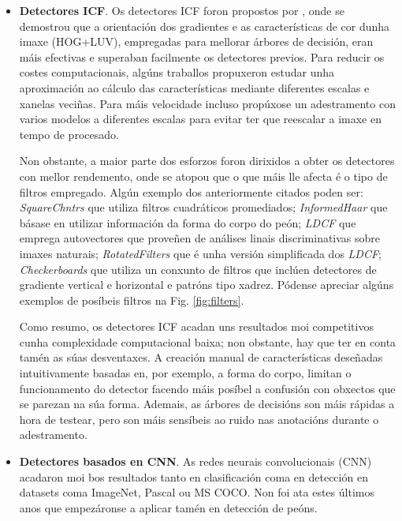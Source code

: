 \documentclass[galician]{./head/uvigo-tfg}
\begin{document}
    \begin{itemize}
        \item \textbf{Detectores ICF}. Os detectores ICF foron propostos por \cite{dollar2014fast}\cite{dollar2009integral}, onde se demostrou que a orientación dos gradientes e as características de cor dunha imaxe (HOG+LUV), empregadas para mellorar árbores de decisión, eran máis efectivas e superaban facilmente os detectores previos. Para reducir os costes computacionais, algúns traballos propuxeron estudar unha aproximación ao cálculo das características mediante diferentes escalas e xanelas veciñas\cite{dollar2012crosstalk}. Para máis velocidade incluso propúxose un adestramento con varios modelos a diferentes escalas para evitar ter que reescalar a imaxe en tempo de procesado\cite{benenson2012pedestrian}.
        \par Non obstante, a maior parte dos esforzos foron dirixidos a obter os detectores con mellor rendemento\cite{benenson2013seeking}\cite{daniel2016semantic}\cite{nam2014local}\cite{paisitkriangkrai2014strengthening}\cite{zhang}\cite{zhang2015exploring}\cite{filtered}, onde se atopou que o que máis lle afecta é o tipo de filtros empregado. Algún exemplo dos anteriormente citados poden ser: \textit{SquareChntrs}\cite{benenson2014ten} que utiliza filtros cuadráticos promediados; \textit{InformedHaar}\cite{zhang} que básase en utilizar información da forma do corpo do peón; \textit{LDCF}\cite{nam2014local} que emprega autovectores que proveñen de análises linais discriminativas sobre imaxes naturais; \textit{RotatedFilters} que é unha versión simplificada dos \textit{LDCF}\cite{zhang2016far}; \textit{Checkerboards}\cite{filtered} que utiliza un conxunto de filtros  que inclúen detectores de gradiente vertical e horizontal e patróns tipo xadrez. Pódense apreciar algúns exemplos de posíbeis filtros na Fig. \ref{fig:filters}.
        \par Como resumo, os detectores ICF acadan uns resultados moi competitivos cunha complexidade computacional baixa; non obstante, hay que ter en conta tamén as súas desventaxes. A creación manual de características deseñadas intuitivamente basadas en, por exemplo, a forma do corpo, limitan o funcionamento do detector facendo máis posíbel a confusión con obxectos que se parezan na súa forma. Ademais, as árbores de decisións son máis rápidas a hora de testear, pero son máis sensíbeis ao ruido nas anotacións durante o adestramento.
        \item\textbf{Detectores basados en CNN}. As redes neurais convolucionais (CNN) acadaron moi bos resultados tanto en clasificación coma en detección en datasets coma ImageNet\cite{krizhevsky2012imagenet}, Pascal ou MS COCO. Non foi ata estes últimos anos que empezáronse a aplicar tamén en detección de peóns.

\end{itemize}
\end{document}
